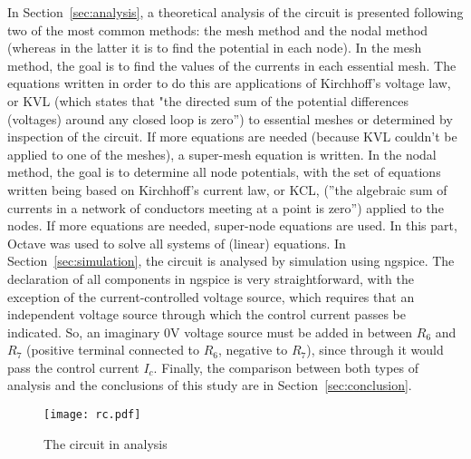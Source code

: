 \par
In Section~\ref{sec:analysis}, a theoretical analysis of the circuit is presented following two of the most common methods: the mesh method and the nodal method (whereas in the latter it is to find the potential in each node). In the mesh method, the goal is to find the values of the currents in each essential mesh. The equations written in order to do this are applications of Kirchhoff's voltage law, or KVL (which states that "the directed sum of the potential differences (voltages) around any closed loop is zero'') to essential meshes or determined by inspection of the circuit. If more equations are needed (because KVL couldn't be applied to one of the meshes), a super-mesh equation is written. In the nodal method, the goal is to determine all node potentials, with the set of equations written being based on Kirchhoff's current law, or KCL, (''the algebraic sum of currents in a network of conductors meeting at a point is zero'') applied to the nodes. If more equations are needed, super-node equations are used. In this part, Octave was used to solve all systems of (linear) equations. In Section~\ref{sec:simulation}, the circuit is analysed by simulation using ngspice. The declaration of all components in ngspice is very straightforward, with the exception of the current-controlled voltage source, which requires that an independent voltage source through which the control current passes be indicated. So, an imaginary 0V voltage source must be added in between $R_6$ and $R_7$ (positive terminal connected to $R_6$, negative to $R_7$), since through it would pass the control current $I_c$. Finally, the comparison between both types of analysis and the conclusions of this study are in Section~\ref{sec:conclusion}.

\begin{figure}[h] \centering
\texttt{[image: rc.pdf]}
\caption{The circuit in analysis}
\label{fig:rc}
\end{figure}
